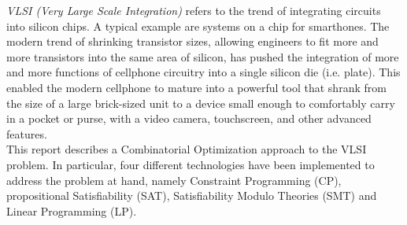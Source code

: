 \textit{VLSI (Very Large Scale Integration)} refers to the trend of integrating circuits into 
silicon chips. A typical example are systems on a chip for smarthones. The modern trend of shrinking transistor sizes,
allowing engineers to fit more and more transistors into the same area of silicon, has pushed the 
integration of more and more functions of cellphone circuitry into a single silicon die (i.e. 
plate). This enabled the modern cellphone to mature into a powerful tool that shrank from the size 
of a large brick-sized unit to a device small enough to comfortably carry in a pocket or purse, 
with a video camera, touchscreen, and other advanced features. \\

This report describes a Combinatorial Optimization approach to the VLSI problem. In particular, 
four different technologies have been implemented to address the problem at hand, namely Constraint 
Programming (CP), propositional Satisfiability (SAT), Satisfiability Modulo Theories (SMT) and 
Linear Programming (LP).